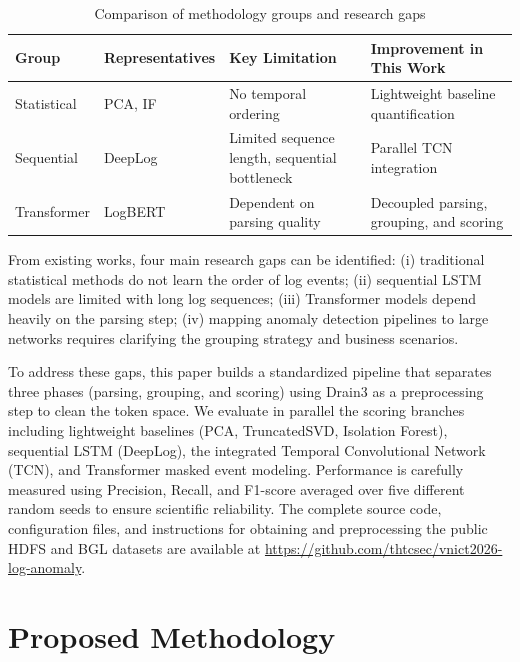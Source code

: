 \documentclass[conference]{IEEEtran}
\begin{document}
\begin{table}[htbp]
\caption{Comparison of methodology groups and research gaps}
\begin{center}
\scriptsize
\setlength{\tabcolsep}{3pt}
\begin{tabular}{lp{1.6cm}p{2.3cm}p{2.1cm}}
\toprule
\textbf{Group} & \textbf{Representatives} & \textbf{Key Limitation} & \textbf{Improvement in This Work} \\
\midrule
Statistical & PCA, IF \cite{b10,b11} & No temporal ordering & Lightweight baseline quantification \\
Sequential & DeepLog \cite{b1,b13} & Limited sequence length, sequential bottleneck & Parallel TCN integration \\
Transformer & LogBERT \cite{b2} & Dependent on parsing quality & Decoupled parsing, grouping, and scoring \\
\bottomrule
\end{tabular}
\label{tab_related_work}
\end{center}
\end{table}

From existing works, four main research gaps can be identified: (i) traditional statistical methods do not learn the order of log events; (ii) sequential LSTM models are limited with long log sequences; (iii) Transformer models depend heavily on the parsing step; (iv) mapping anomaly detection pipelines to large networks requires clarifying the grouping strategy and business scenarios. 

To address these gaps, this paper builds a standardized pipeline that separates three phases (parsing, grouping, and scoring) using Drain3 as a preprocessing step to clean the token space. We evaluate in parallel the scoring branches including lightweight baselines (PCA, TruncatedSVD, Isolation Forest), sequential LSTM (DeepLog), the integrated Temporal Convolutional Network (TCN), and Transformer masked event modeling. Performance is carefully measured using Precision, Recall, and F1-score averaged over five different random seeds to ensure scientific reliability. The complete source code, configuration files, and instructions for obtaining and preprocessing the public HDFS and BGL datasets are available at \url{https://github.com/thtcsec/vnict2026-log-anomaly}.

\section{Proposed Methodology}
\end{document}
